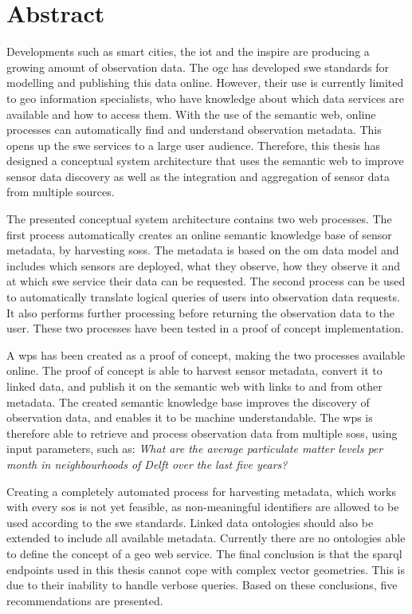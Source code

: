 
\chapter*{Abstract}


Developments such as smart cities, the \acf*{iot} and the \ac*{inspire} are producing a growing amount of observation data. The \ac*{ogc} has developed \ac*{swe} standards for modelling and publishing this data online. However, their use is currently limited to geo information specialists, who have knowledge about which data services are available and how to access them. With the use of the semantic web, online processes can automatically find and understand observation metadata. This opens up the \acs*{swe} services to a large user audience. Therefore, this thesis has designed a conceptual system architecture that uses the semantic web to improve sensor data discovery as well as the integration and aggregation of sensor data from multiple sources.

The presented conceptual system architecture contains two web processes. The first process automatically creates an online semantic knowledge base of sensor metadata, by harvesting \aclp*{sos}. The metadata is based on the \acf*{om} data model and includes which sensors are deployed, what they observe, how they observe it and at which \acs*{swe} service their data can be requested. The second process can be used to automatically translate logical queries of users into observation data requests. It also performs further processing before returning the observation data to the user. These two processes have been tested in a proof of concept implementation.

A \ac*{wps} has been created as a proof of concept, making the two processes available online. The proof of concept is able to harvest sensor metadata, convert it to linked data, and publish it on the semantic web with links to and from other metadata. The created semantic knowledge base improves the discovery of observation data, and enables it to be machine understandable. The \acs*{wps} is therefore able to retrieve and process observation data from multiple \aclp*{sos}, using input parameters, such as: \textit{What are the average particulate matter levels per month in neighbourhoods of Delft over the last five years?}  
 
Creating a completely automated process for harvesting metadata, which works with every \acl*{sos} is not yet feasible, as non-meaningful identifiers are allowed to be used according to the \acs*{swe} standards. Linked data ontologies should also be extended to include all available metadata. Currently there are no ontologies able to define the concept of a geo web service. The final conclusion is that the \acs*{sparql} endpoints used in this thesis cannot cope with complex vector geometries. This is due to their inability to handle verbose queries. Based on these conclusions, five recommendations are presented.